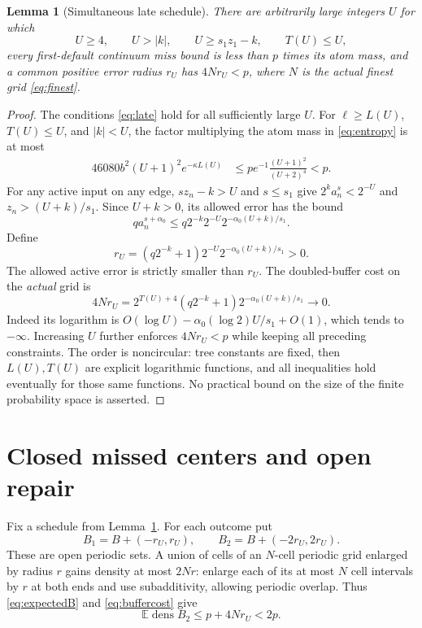 \documentclass[11pt]{article}
\newtheorem{lemma}[theorem]{Lemma}
\theoremstyle{definition}
\theoremstyle{remark}
\newcommand{\dens}{\operatorname{dens}}
\begin{document}
\begin{lemma}[Simultaneous late schedule]\label{lem:schedule}
There are arbitrarily large integers $U$ for which
\begin{equation}\label{eq:late}
 U\geq4,\qquad U>|k|,\qquad U\geq s_1z_1-k,\qquad T(U)\leq U,
\end{equation}
every first-default continuum miss bound is less than $p$ times its atom mass,
and a common positive error radius $r_U$ has $4Nr_U<p$, where $N$ is the
actual finest grid \eqref{eq:finest}.
\end{lemma}
\begin{proof}
The conditions \eqref{eq:late} hold for all sufficiently large $U$.
For $\ell\geq L(U)$, $T(U)\leq U$, and $|k|<U$, the factor multiplying the
atom mass in \eqref{eq:entropy} is at most
\begin{align}
 46080b^2(U+1)^2e^{-\kappa L(U)}
 &\leq p e^{-1}\frac{(U+1)^2}{(U+2)^4}<p.\label{eq:smallentropy}
\end{align}
For any active input on any edge, $sz_n-k>U$ and $s\leq s_1$ give
$2^k a_n^s<2^{-U}$ and $z_n>(U+k)/s_1$. Since $U+k>0$, its allowed error
has the bound
\[
 q a_n^{s+\alpha_0}
 \leq q2^{-k}2^{-U}2^{-\alpha_0(U+k)/s_1}.
\]
Define
\begin{equation}\label{eq:radius}
 r_U=(q2^{-k}+1)2^{-U}2^{-\alpha_0(U+k)/s_1}>0.
\end{equation}
The allowed active error is strictly smaller than $r_U$. The doubled-buffer
cost on the \emph{actual} grid is
\begin{equation}\label{eq:buffercost}
 4Nr_U=2^{T(U)+4}(q2^{-k}+1)2^{-\alpha_0(U+k)/s_1}\longrightarrow0.
\end{equation}
Indeed its logarithm is $O(\log U)-\alpha_0(\log2)U/s_1+O(1)$, which tends
to $-\infty$. Increasing $U$ further enforces $4Nr_U<p$ while keeping all
preceding constraints. The order is noncircular: tree constants are fixed,
then $L(U),T(U)$ are explicit logarithmic functions, and all inequalities
hold eventually for those same functions. No practical bound on the size
of the finite probability space is asserted.
\end{proof}

\section{Closed missed centers and open repair}\label{sec:repair}
Fix a schedule from Lemma~\ref{lem:schedule}. For each outcome put
\[
 B_1=B+(-r_U,r_U),\qquad B_2=B+(-2r_U,2r_U).
\]
These are open periodic sets. A union of cells of an $N$-cell periodic grid
enlarged by radius $r$ gains density at most $2Nr$: enlarge each of its at
most $N$ cell intervals by $r$ at both ends and use subadditivity, allowing
periodic overlap. Thus \eqref{eq:expectedB} and \eqref{eq:buffercost} give
\begin{equation}\label{eq:expectedbuffer}
 \mathbb E\dens B_2\leq p+4Nr_U<2p.
\end{equation}
\end{document}
